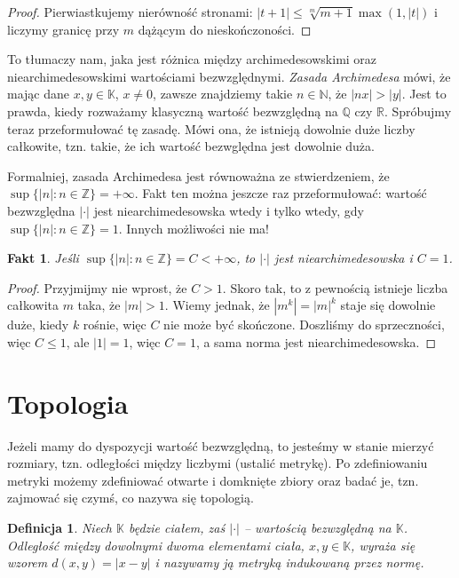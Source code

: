 \documentclass[a4paper,fleqn]{article}
\newtheorem{fkt}{Fakt}
\newtheorem{dff}{Definicja}
\begin{document}
\begin{multicols}{2}
\begin{proof}
Pierwiastkujemy nierówność stronami: $|t+1| \le \sqrt[m]{m+1} \max(1,|t|)$ i liczymy granicę przy $m$ dążącym do nieskończoności.
\end{proof}

To tłumaczy nam, jaka jest różnica między archimedesowskimi oraz niearchimedesowskimi wartościami bezwzględnymi. \emph{Zasada Archimedesa} mówi, że mając dane $x,y\in \mathbb K$, $x\neq 0$, zawsze znajdziemy takie $n\in\mathbb N$, że $|nx| > |y|$. Jest to prawda, kiedy rozważamy klasyczną wartość bezwzględną na $\mathbb Q$ czy $\mathbb R$. Spróbujmy teraz przeformułować tę zasadę. Mówi ona, że istnieją dowolnie duże liczby całkowite, tzn. takie, że ich wartość bezwględna jest dowolnie duża.

Formalniej, zasada Archimedesa jest równoważna ze stwierdzeniem, że $\sup\{|n|:n\in\mathbb Z\} = +\infty$. Fakt ten można jeszcze raz przeformułować: wartość bezwzględna $|\cdot|$ jest niearchimedesowska wtedy i tylko wtedy, gdy $\sup\{|n|:n\in\mathbb Z\} = 1$. Innych możliwości nie ma!

\begin{fkt}Jeśli $\sup\{|n|:n\in\mathbb Z\} = C < +\infty$, to $|\cdot|$ jest niearchimedesowska i $C = 1$.\end{fkt}

\begin{proof}Przyjmijmy nie wprost, że $C > 1$. Skoro tak, to z pewnością istnieje liczba całkowita $m$ taka, że $|m| > 1$. Wiemy jednak, że $|m^k| = |m|^k$ staje się dowolnie duże, kiedy $k$ rośnie, więc $C$ nie może być skończone. Doszliśmy do sprzeczności, więc $C \le 1$, ale $|1| = 1$, więc $C=1$, a sama norma jest niearchimedesowska.\end{proof}

\section{Topologia}
Jeżeli mamy do dyspozycji wartość bezwzględną, to jesteśmy w stanie mierzyć rozmiary, tzn. odległości między liczbymi (ustalić metrykę). Po zdefiniowaniu metryki możemy zdefiniować otwarte i domknięte zbiory oraz badać je, tzn. zajmować się czymś, co nazywa się topologią.

\begin{dff}Niech $\mathbb K$ będzie ciałem, zaś $|\cdot|$ -- wartością bezwzględną na $\mathbb K$. Odległość między dowolnymi dwoma elementami ciała, $x,y\in\mathbb K$, wyraża się wzorem $d(x,y) = |x-y|$ i nazywamy ją metryką indukowaną przez normę.\end{dff}


\end{multicols}
\end{document}
